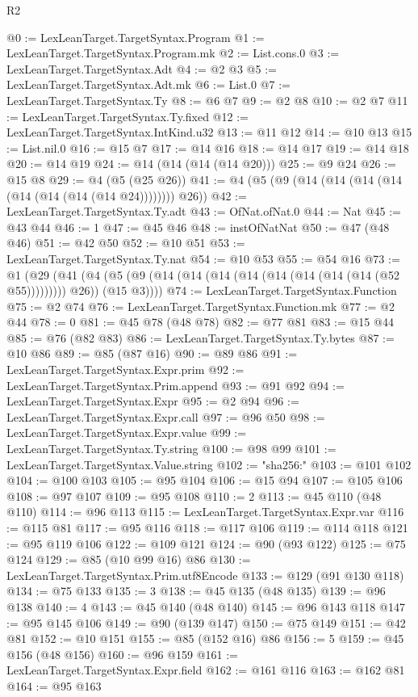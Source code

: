 \begin{lexlean}{R2}
\begin{coremodule}
@0 := LexLeanTarget.TargetSyntax.Program
@1 := LexLeanTarget.TargetSyntax.Program.mk
@2 := List.cons.{0}
@3 := LexLeanTarget.TargetSyntax.Adt
@4 := @2 @3
@5 := LexLeanTarget.TargetSyntax.Adt.mk
@6 := List.{0}
@7 := LexLeanTarget.TargetSyntax.Ty
@8 := @6 @7
@9 := @2 @8
@10 := @2 @7
@11 := LexLeanTarget.TargetSyntax.Ty.fixed
@12 := LexLeanTarget.TargetSyntax.IntKind.u32
@13 := @11 @12
@14 := @10 @13
@15 := List.nil.{0}
@16 := @15 @7
@17 := @14 @16
@18 := @14 @17
@19 := @14 @18
@20 := @14 @19
@24 := @14 (@14 (@14 (@14 @20)))
@25 := @9 @24
@26 := @15 @8
@29 := @4 (@5 (@25 @26))
@41 := @4 (@5 (@9 (@14 (@14 (@14 (@14 (@14 (@14 (@14 (@14 @24)))))))) @26))
@42 := LexLeanTarget.TargetSyntax.Ty.adt
@43 := OfNat.ofNat.{0}
@44 := Nat
@45 := @43 @44
@46 := 1
@47 := @45 @46
@48 := instOfNatNat
@50 := @47 (@48 @46)
@51 := @42 @50
@52 := @10 @51
@53 := LexLeanTarget.TargetSyntax.Ty.nat
@54 := @10 @53
@55 := @54 @16
@73 := @1
    (@29
      (@41 (@4 (@5 (@9 (@14 (@14 (@14 (@14 (@14 (@14 (@14 (@14 (@52 @55))))))))) @26)) (@15 @3))))
@74 := LexLeanTarget.TargetSyntax.Function
@75 := @2 @74
@76 := LexLeanTarget.TargetSyntax.Function.mk
@77 := @2 @44
@78 := 0
@81 := @45 @78 (@48 @78)
@82 := @77 @81
@83 := @15 @44
@85 := @76 (@82 @83)
@86 := LexLeanTarget.TargetSyntax.Ty.bytes
@87 := @10 @86
@89 := @85 (@87 @16)
@90 := @89 @86
@91 := LexLeanTarget.TargetSyntax.Expr.prim
@92 := LexLeanTarget.TargetSyntax.Prim.append
@93 := @91 @92
@94 := LexLeanTarget.TargetSyntax.Expr
@95 := @2 @94
@96 := LexLeanTarget.TargetSyntax.Expr.call
@97 := @96 @50
@98 := LexLeanTarget.TargetSyntax.Expr.value
@99 := LexLeanTarget.TargetSyntax.Ty.string
@100 := @98 @99
@101 := LexLeanTarget.TargetSyntax.Value.string
@102 := "sha256:"
@103 := @101 @102
@104 := @100 @103
@105 := @95 @104
@106 := @15 @94
@107 := @105 @106
@108 := @97 @107
@109 := @95 @108
@110 := 2
@113 := @45 @110 (@48 @110)
@114 := @96 @113
@115 := LexLeanTarget.TargetSyntax.Expr.var
@116 := @115 @81
@117 := @95 @116
@118 := @117 @106
@119 := @114 @118
@121 := @95 @119 @106
@122 := @109 @121
@124 := @90 (@93 @122)
@125 := @75 @124
@129 := @85 (@10 @99 @16) @86
@130 := LexLeanTarget.TargetSyntax.Prim.utf8Encode
@133 := @129 (@91 @130 @118)
@134 := @75 @133
@135 := 3
@138 := @45 @135 (@48 @135)
@139 := @96 @138
@140 := 4
@143 := @45 @140 (@48 @140)
@145 := @96 @143 @118
@147 := @95 @145 @106
@149 := @90 (@139 @147)
@150 := @75 @149
@151 := @42 @81
@152 := @10 @151
@155 := @85 (@152 @16) @86
@156 := 5
@159 := @45 @156 (@48 @156)
@160 := @96 @159
@161 := LexLeanTarget.TargetSyntax.Expr.field
@162 := @161 @116
@163 := @162 @81
@164 := @95 @163

\end{coremodule}
\end{lexlean}
